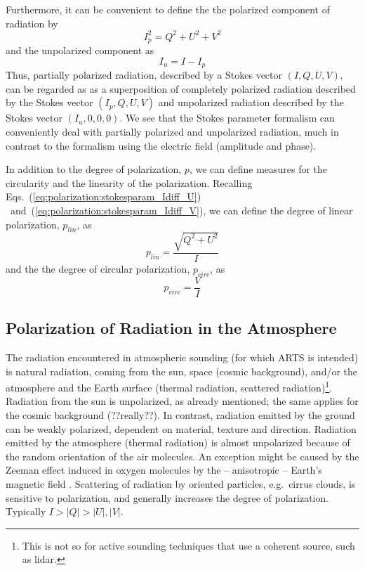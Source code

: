Furthermore, it can be convenient to define the the polarized
component of radiation by
\begin{equation}
  \label{eq:polarization:pol_component}
  I_p^2 = Q^2 + U^2 + V^2
\end{equation}
and the unpolarized component as
\begin{equation}
  \label{eq:polarization:unpol_component}
  I_u = I - I_p
\end{equation}
Thus, partially polarized radiation, described by a Stokes vector $(I,
Q, U, V)$, can be regarded as as a superposition of completely
polarized radiation described by the Stokes vector $(I_p, Q, U, V)$
and unpolarized radiation described by the Stokes vector $(I_u,
0,0,0)$.  We see that the Stokes parameter formalism can conveniently
deal with partially polarized and unpolarized radiation, much in
contrast to the formalism using the electric field (amplitude and
phase).

In addition to the degree of polarization, $p$, we can define measures
for the circularity and the linearity of the polarization.
Recalling Eqs.~(\ref{eq:polarization:stokesparam_Idiff_U})%
~and~(\ref{eq:polarization:stokesparam_Idiff_V}),
we can define the degree of linear polarization, $p_{lin}$, as
\begin{equation}
  \label{eq:polarization:p_lin}
 p_{lin} = \frac{\sqrt{Q^2 + U^2}}{I} 
\end{equation}
and the the degree of circular polarization, $p_{circ}$, as
\begin{equation}
  \label{eq:polarization:p_circ}
 p_{circ} = \frac{V}{I} 
\end{equation}


\subsection{Polarization of Radiation in the Atmosphere}
\label{sec:polarization:atmosphere}
The radiation encountered in atmospheric sounding (for which ARTS is
intended) is natural radiation, coming from the sun, space (cosmic
background), and/or the atmosphere and the Earth surface (thermal
radiation, scattered radiation)\footnote{This is not so for active
  sounding techniques that use a coherent source, such as lidar.}.
Radiation from the sun is unpolarized, as already mentioned; the same
applies for the cosmic background (??really??).  In contrast,
radiation emitted by the ground can be weakly polarized, dependent on
material, texture and direction.  Radiation emitted by the atmosphere
(thermal radiation) is almost unpolarized because of the random
orientation of the air molecules.  An exception might be caused by the
Zeeman effect induced in oxygen molecules by the -- anisotropic --
Earth's magnetic field .  Scattering of radiation by oriented
particles, e.g.\ cirrus clouds, is sensitive to polarization, and
generally increases the degree of polarization.  Typically $I > |Q| >
|U|,|V|$.

